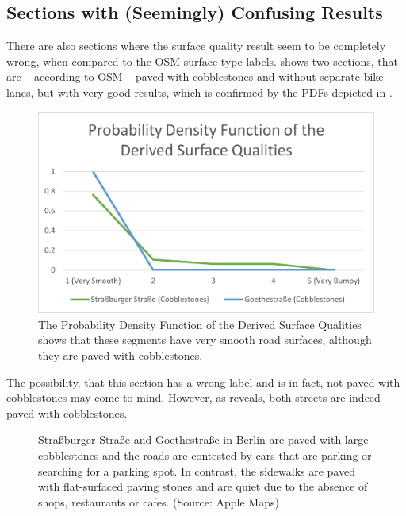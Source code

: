 \subsection{Sections with (Seemingly) Confusing Results}
\label{subsec:sections_with_seemingly_confusing_results}
There are also sections where the surface quality result seem to be completely wrong, when compared to the OSM surface type labels.
 shows two sections, that are -- according to OSM -- paved with cobblestones and without separate bike lanes, but with very good results, which is confirmed by the PDFs depicted in .

\begin{figure}
    \centering
    \includegraphics[width=0.7\columnwidth]{fig/pdf_mismatched.png}
    \caption{%
        The Probability Density Function of the Derived Surface Qualities shows that these segments have very smooth road surfaces, although they are paved with cobblestones.
    }%
    \label{fig:mismatched}
\end{figure}

The possibility, that this section has a wrong label and is in fact, not paved with cobblestones may come to mind.
However, as  reveals, both streets are indeed paved with cobblestones.

\begin{figure}[t]
    \centering
    \hfill
    \caption{%
        Straßburger Straße and Goethestraße in Berlin are paved with large cobblestones and the roads are contested by cars that are parking or searching for a parking spot. In contrast, the sidewalks are paved with flat-surfaced paving stones and are quiet due to the absence of shops, restaurants or cafes. (Source: Apple Maps)
    }%
    \label{fig:sidewalk}
    \vspace{-.5em}
\end{figure}

